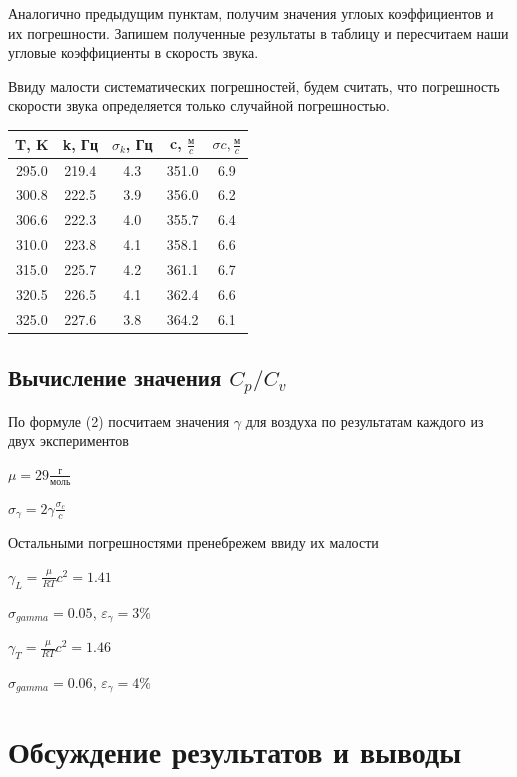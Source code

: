 \documentclass[12pt,a4paper]{article}
\begin{document}
Аналогично предыдущим пунктам, получим значения углоых коэффициентов и их погрешности. Запишем полученные результаты в таблицу и пересчитаем наши угловые коэффициенты в скорость звука.

Ввиду малости систематических погрешностей, будем считать, что погрешность скорости звука определяется только случайной погрешностью.

\begin{center}
\begin{tabular}{|c|c|c|c|c|}
 \hline 
 T, K & k, Гц & $\sigma_{k}$, Гц &  c, $\frac{\text{м}}{c}$ & $\sigma{c}, \frac{\text{м}}{c}$ \\ 
 \hline 
 295.0 & 219.4 & 4.3 & 351.0 & 6.9  \\ 
 \hline 
 300.8 & 222.5 & 3.9 & 356.0 & 6.2  \\ 
 \hline 
 306.6 & 222.3 & 4.0 & 355.7 & 6.4  \\ 
 \hline 
 310.0 & 223.8 & 4.1 & 358.1 & 6.6  \\ 
 \hline 
 315.0 & 225.7 & 4.2 & 361.1 & 6.7  \\ 
 \hline 
 320.5 & 226.5 & 4.1 & 362.4 & 6.6  \\ 
 \hline 
 325.0 & 227.6 & 3.8 & 364.2 & 6.1  \\ 
 \hline 
 \end{tabular}  
\end{center}

\subsection{Вычисление значения $C_{p}/C_{v}$}

По формуле (2) посчитаем значения $\gamma$ для воздуха по результатам каждого из двух экспериментов

$\mu = 29 \frac{\text{г}}{\text{моль}}$ 

$\sigma_{\gamma} = 2\gamma\frac{\sigma_{c}}{c}$ 

Остальными погрешностями пренебрежем ввиду их малости

$\gamma_{L} = \frac{\mu}{RT}c^2 = 1.41$

$\sigma_{gamma} = 0.05$, $\varepsilon_{\gamma} = 3 \%$

$\gamma_{T} = \frac{\mu}{RT}c^2 = 1.46$

$\sigma_{gamma} = 0.06$, $\varepsilon_{\gamma} = 4 \%$

\newpage

\section{Обсуждение результатов и выводы}
\end{document}
